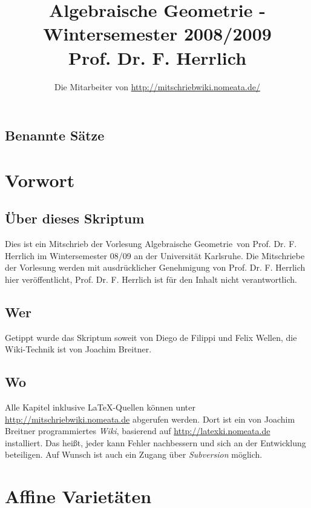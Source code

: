 \documentclass[a4paper,12pt]{report}
\title{Algebraische Geometrie - Wintersemester 2008/2009\\ Prof. Dr. F. Herrlich}
\author{Die Mitarbeiter von \url{http://mitschriebwiki.nomeata.de/}}
\theoremstyle{break}
\theoremstyle{nonumberbreak}
\theoremstyle{nonumberplain}
\begin{document}
\maketitle

\setlength\parskip{0.6pt}
\tableofcontents

\section*{Benannte Sätze}


\setlength\parskip{\smallskipamount}

\chapter{Vorwort}
\setcounter{secnumdepth}{2}
\section*{Über dieses Skriptum}
Dies ist ein Mitschrieb der Vorlesung \glqq Algebraische Geometrie\grqq\ von Prof. Dr. F. Herrlich im
Wintersemester 08/09 an der Universität Karlsruhe.
Die Mitschriebe der Vorlesung werden mit ausdrücklicher Genehmigung von Prof. Dr. F. Herrlich hier veröffentlicht,
Prof. Dr. F. Herrlich ist für  den Inhalt nicht verantwortlich.
\section*{Wer}
Getippt wurde das Skriptum soweit von Diego de Filippi und Felix Wellen, die Wiki-Technik ist von Joachim Breitner.

\section*{Wo}
Alle Kapitel inklusive \LaTeX-Quellen können unter \url{http://mitschriebwiki.nomeata.de} abgerufen werden.
Dort ist ein von Joachim Breitner programmiertes \emph{Wiki}, basierend auf \url{http://latexki.nomeata.de} installiert. 
Das heißt, jeder kann Fehler nachbessern und sich an der Entwicklung
beteiligen. Auf Wunsch ist auch ein Zugang über \emph{Subversion} möglich.


\chapter{Affine Varietäten}
\end{document}
